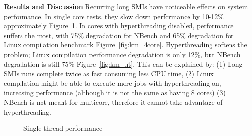 \documentclass{IEEEtran}
\begin{document}
\textbf{Results and Discussion}
\indent Recurring long SMIs have noticeable effects on system performance. In single core tests, they slow down performance by 10-12\% approximately Figure~\ref{fig:km_single}. In cores with hyperthreading disabled, performance suffers the most, with 75\% degradation for NBench and 65\% degradation for Linux compilation benchmark Figure~\ref{fig:km_4core}. Hyperthreading softens the problem; Linux compilation performance degradation is only 12\%, but NBench degradation is still 75\% Figure~\ref{fig:km_ht}. This can be explained by: (1) Long SMIs runs complete twice as fast consuming less CPU time, (2) Linux compilation might be able to execute more jobs with hyperthreading on, increasing performance (although it is not the same as having 8 cores) (3) NBench is not meant for multicore, therefore it cannot take advantage of hyperthreading.

\begin{figure}[h]
\caption{Single thread performance}
\label{fig:km_single}
\end{figure}
\end{document}
